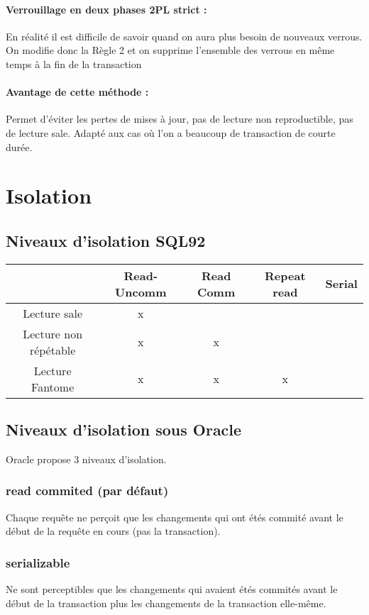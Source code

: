 \documentclass[10pt,a4paper,twoside]{article}
\begin{document}
\paragraph{Verrouillage en deux phases 2PL strict : } En réalité il est difficile de savoir quand on aura plus besoin de nouveaux verrous. On modifie donc la Règle 2 et on supprime l'ensemble des verrous en même temps à la fin de la transaction

\paragraph{Avantage de cette méthode :} Permet d'éviter les pertes de mises à jour, pas de lecture non reproductible, pas de lecture sale. Adapté aux cas où l'on a beaucoup de transaction de courte durée.

\section{Isolation}
\subsection{Niveaux d'isolation SQL92}

\begin{tabular}{|c|c|c|c|c|}
\hline 
 & Read-Uncomm & Read Comm & Repeat read & Serial \\ 
\hline 
Lecture sale & x &  &  &  \\ 
\hline 
Lecture non répétable & x & x &  &  \\ 
\hline 
Lecture Fantome & x & x & x &  \\ 
\hline 
\end{tabular} 

\subsection{Niveaux d'isolation sous Oracle}

Oracle propose 3 niveaux d'isolation.

\subsubsection{read commited (par défaut)}
Chaque requête ne perçoit que les changements qui ont étés commité avant le début de la requête en cours (pas la transaction).

\subsubsection{serializable}
Ne sont perceptibles que les changements qui avaient étés commités avant le début de la transaction plus les changements de la transaction elle-même.	
\end{document}

